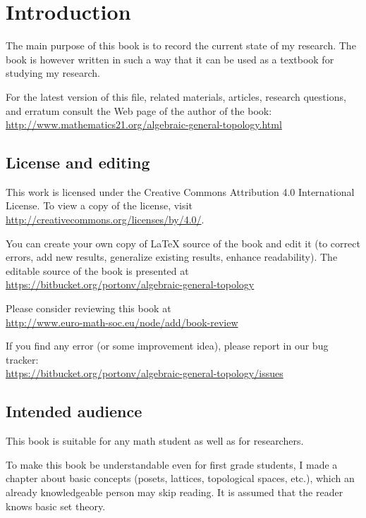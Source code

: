 
\chapter{Introduction}

The main purpose of this book is to record the current state of my
research. The book is however written in such a way that it can be
used as a textbook for studying my research.

For the latest version of this file,
related materials, articles, research questions, and erratum consult
the Web page of the author of the book:\\
\url{http://www.mathematics21.org/algebraic-general-topology.html}


\section{License and editing}

This work is licensed under the Creative Commons Attribution 4.0 International
License. To view a copy of the license, visit\\
\href{http://creativecommons.org/licenses/by/4.0/}{http://creativecommons.org/licenses/by/4.0/}.

You can create your own copy of \LaTeX{} source of the book and edit it (to correct errors, add new results, generalize existing results,
enhance readability).
The editable source of the book is presented at\\
\href{https://bitbucket.org/portonv/algebraic-general-topology}{https://bitbucket.org/portonv/algebraic-general-topology}

Please consider reviewing this book at\\
\href{http://www.euro-math-soc.eu/node/add/book-review}{http://www.euro-math-soc.eu/node/add/book-review}

If you find any error (or some improvement idea), please report in our bug tracker:\\
\url{https://bitbucket.org/portonv/algebraic-general-topology/issues}

\section{Intended audience }

This book is suitable for any math student as well as for researchers.

To make this book be understandable even for first grade students,
I made a chapter about basic concepts (posets, lattices, topological
spaces, etc.), which an already knowledgeable person may skip reading.
It is assumed that the reader knows basic set theory.

